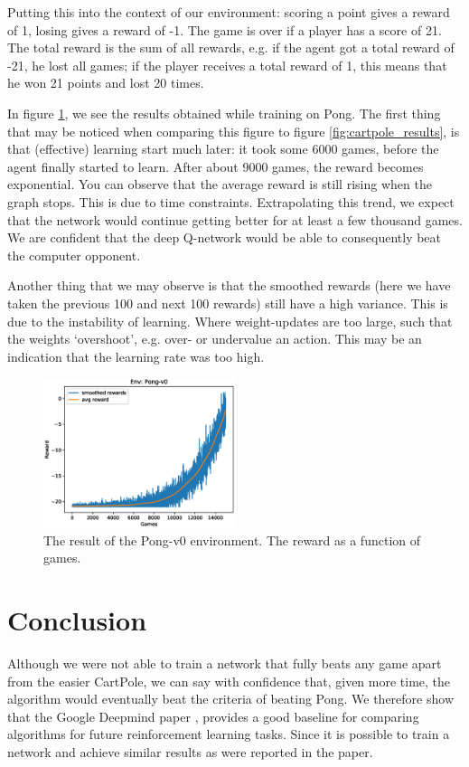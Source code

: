 \documentclass{article}
\begin{document}
Putting this into the context of our environment: scoring a point gives a reward of 1, losing gives a reward of -1. The game is over if a player has a score of 21. The total reward is the sum of all rewards, e.g. if the agent got a total reward of -21, he lost all games; if the player receives a total reward of 1, this means that he won 21 points and lost 20 times.

In figure \ref{fig:pong_results}, we see the results obtained while training on Pong. The first thing that may be noticed when comparing this figure to figure \ref{fig:cartpole_results}, is that (effective) learning start much later: it took some 6000 games, before the agent finally started to learn. After about 9000 games, the reward becomes exponential. You can observe that the average reward is still rising when the graph stops. This is due to time constraints. Extrapolating this trend, we expect that the network would continue getting better for at least a few thousand games. We are confident that the deep Q-network would  be able to consequently beat the computer opponent.

Another thing that we may observe is that the smoothed rewards (here we have taken the previous 100 and next 100 rewards) still have a high variance. This is due to the instability of learning. Where weight-updates are too large, such that the weights `overshoot', e.g. over- or undervalue an action. This may be an indication that the learning rate was too high.

\begin{figure}[H]
\centering
\includegraphics[width=0.5\textwidth]{images/pong_results.eps}
\caption{The result of the Pong-v0 environment. The reward as a function of games.}
\label{fig:pong_results}
\end{figure}

\section{Conclusion}
Although we were not able to train a network that fully beats any game apart from the easier CartPole, we can say with confidence that, given more time, the algorithm would eventually beat the criteria of beating Pong. We therefore show that the Google Deepmind paper \cite{mnih2013playing}, provides a good baseline for comparing algorithms for future reinforcement learning tasks. Since it is possible to train a network and achieve similar results as were reported in the paper.
\end{document}
